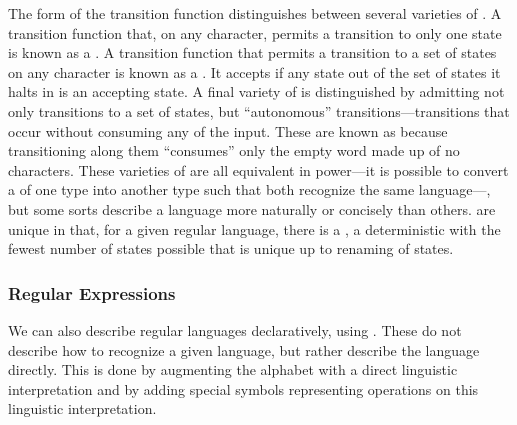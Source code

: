 The form of the transition function distinguishes between several varieties of \FAs. A transition function that, on any character, permits a transition to only one state is known as a . A transition function that permits a transition to a set of states on any character is known as a . It accepts if any state out of the set of states it halts in is an accepting state. A final variety of \FA is distinguished by admitting not only transitions to a set of states, but ``autonomous'' transitions---transitions that occur without consuming any of the input. These are known as  because transitioning along them ``consumes'' only the empty word \emptyword made up of no characters. These varieties of \FAs are all equivalent in power---it is possible to convert a \FA of one type into another type such that both recognize the same language---, but some sorts describe a language more naturally or concisely than others. \FAs are unique in that, for a given regular language, there is a , a deterministic \FA with the fewest number of states possible that is unique up to renaming of states.

\subsubsection{Regular Expressions}
We can also describe regular languages declaratively, using . These do not describe how to recognize a given language, but rather describe the language directly. This is done by augmenting the alphabet with a direct linguistic interpretation and by adding special symbols representing operations on this linguistic interpretation. 

